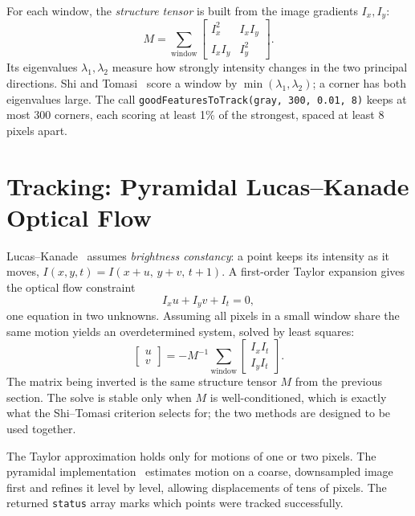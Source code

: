 \documentclass[11pt]{article}
\begin{document}
For each window, the \emph{structure tensor} is built from the image gradients
$I_x, I_y$:
\begin{equation}
M = \sum_{\text{window}} \begin{bmatrix} I_x^2 & I_x I_y \\ I_x I_y & I_y^2 \end{bmatrix}.
\end{equation}
Its eigenvalues $\lambda_1,\lambda_2$ measure how strongly intensity changes in
the two principal directions. Shi and Tomasi~\cite{shi1994} score a window by
$\min(\lambda_1,\lambda_2)$; a corner has both eigenvalues large.
The call \texttt{goodFeaturesToTrack(gray, 300, 0.01, 8)} keeps at most 300
corners, each scoring at least 1\% of the strongest, spaced at least 8 pixels
apart.

\section{Tracking: Pyramidal Lucas--Kanade Optical Flow}
Lucas--Kanade~\cite{lucas1981} assumes \emph{brightness constancy}: a point
keeps its intensity as it moves,
$I(x,y,t) = I(x+u,\,y+v,\,t+1)$. A first-order Taylor expansion gives the
optical flow constraint
\begin{equation}
I_x u + I_y v + I_t = 0,
\end{equation}
one equation in two unknowns. Assuming all pixels in a small window share the
same motion yields an overdetermined system, solved by least squares:
\begin{equation}
\begin{bmatrix} u \\ v \end{bmatrix}
= -M^{-1} \sum_{\text{window}} \begin{bmatrix} I_x I_t \\ I_y I_t \end{bmatrix}.
\end{equation}
The matrix being inverted is the same structure tensor $M$ from the previous
section. The solve is stable only when $M$ is well-conditioned, which is
exactly what the Shi--Tomasi criterion selects for; the two methods are
designed to be used together.

The Taylor approximation holds only for motions of one or two pixels. The
pyramidal implementation~\cite{bouguet2000} estimates motion on a coarse,
downsampled image first and refines it level by level, allowing displacements
of tens of pixels. The returned \texttt{status} array marks which points were
tracked successfully.
\end{document}
